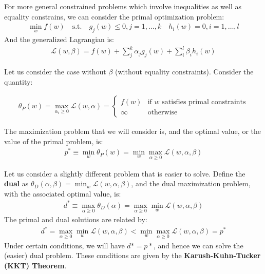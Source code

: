\documentclass[letterpaper,10pt]{article}
\begin{document}
For more general constrained problems which involve inequalities as well as equality constrains, we can consider the primal optimization problem:
\begin{align}
\min_w f(w) \quad \text{s.t.} \quad g_j(w) \leq 0, j=1,\ldots,k \quad h_i(w)=0, i=1,\ldots,l
\end{align}
And the generalized Lagrangian is:
\begin{align}
\mathcal{L}(w,\beta) = f(w) + \sum_{j}^k \alpha_j g_j(w) + \sum_{i}^l \beta_i h_i(w)
\end{align}

Let us consider the case without $\beta$ (without equality constraints). Consider the quantity:

\begin{align}
\theta_P (w) = \max_{\alpha_i \geq 0} \mathcal{L}(w, \alpha) = \begin{cases}
f(w) & \text{if } w \text{ satisfies primal constraints} \\
\infty & \text{otherwise} 
\end{cases}
\end{align}

The maximization problem that we will consider is, and the optimal value, or the value of the primal problem, is:
\begin{align}
p^* \equiv \min_w \theta_P (w) = \min_w \max_{\alpha \geq 0} \mathcal{L}(w, \alpha, \beta)
\end{align}

Let us consider a slightly different problem that is easier to solve. Define the \textbf{dual} as $\theta_D (\alpha, \beta) = \min_w \mathcal{L} (w, \alpha, \beta)$, and the dual maximization problem, with the associated optimal value, is:
\begin{align}
d^* \equiv \max_{\alpha \geq 0} \theta_D (\alpha) = \max_{\alpha\geq 0} \min_{w} \mathcal{L}(w,\alpha,\beta)
\end{align}
The primal and dual solutions are related by:
\begin{align}
d^* = \max_{\alpha \geq 0} \min_w \mathcal{L}(w, \alpha, \beta) < \min_w \max_{\alpha \geq 0} \mathcal{L}(w, \alpha, \beta) = p^*
\end{align}
Under certain conditions, we will have $d* = p*$, and hence we can solve the (easier) dual problem. These conditions are given by the \textbf{Karush-Kuhn-Tucker (KKT) Theorem}.
\end{document}
